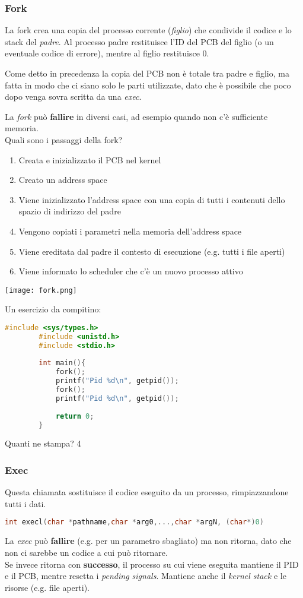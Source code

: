\subsubsection{Fork}
La fork crea una copia del processo corrente (\emph{figlio}) che condivide il codice e lo stack del \emph{padre}. Al processo padre restituisce l'ID del PCB del figlio (o un eventuale codice di errore), mentre al figlio restituisce 0.
\begin{note}
	Come detto in precedenza la copia del PCB non è totale tra padre e figlio, ma fatta in modo che ci siano solo le parti utilizzate, dato che è possibile che poco dopo venga sovra scritta da una \emph{exec}.
\end{note}
\noindent La \emph{fork} può \textbf{fallire} in diversi casi, ad esempio quando non c'è sufficiente memoria.\\
Quali sono i passaggi della fork?
\begin{enumerate}
	\item Creata e inizializzato il PCB nel kernel
	\item Creato un address space
	\item Viene inizializzato l'address space con una copia di tutti i contenuti dello spazio di indirizzo del padre
	\item Vengono copiati i parametri nella memoria dell'address space
	\item Viene ereditata dal padre il contesto di esecuzione (e.g. tutti i file aperti)
	\item Viene informato lo scheduler che c'è un nuovo processo attivo
\end{enumerate}
\begin{center}
	\texttt{[image: fork.png]}
\end{center}
\begin{example}
	Un esercizio da compitino:
	\begin{lstlisting}[language=c]
		#include <sys/types.h>
		#include <unistd.h>
		#include <stdio.h>
		
		int main(){
			fork();
			printf("Pid %d\n", getpid());
			fork();
			printf("Pid %d\n", getpid());
			
			return 0;
		}
	\end{lstlisting}
	Quanti ne stampa? 4
\end{example}

\subsubsection{Exec}
Questa chiamata sostituisce il codice eseguito da un processo, rimpiazzandone tutti i dati.
\begin{lstlisting}[language=C]
	int execl(char *pathname,char *arg0,...,char *argN, (char*)0)
\end{lstlisting}
La \emph{exec} può \textbf{fallire} (e.g. per un parametro sbagliato) ma non ritorna, dato che non ci sarebbe un codice a cui può ritornare.\\
Se invece ritorna con \textbf{successo}, il processo su cui viene eseguita mantiene il PID e il PCB, mentre resetta i \emph{pending signals}. Mantiene anche il \emph{kernel stack} e le risorse (e.g. file aperti).


